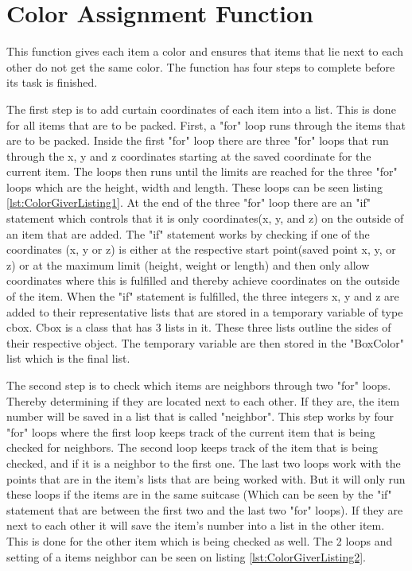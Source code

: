 \section{Color Assignment Function}
\label{sec:ColorGiver}
This function gives each item a color and ensures that items that lie next to each other do not get the same color. The function has four steps to complete before its task is finished.

The first step is to add curtain coordinates of each item into a list. This is done for all items that are to be packed. First, a "for" loop runs through the items that are to be packed. Inside the first "for" loop there are three "for" loops that run through the x, y and z coordinates starting at the saved coordinate for the current item. The loops then runs until the limits are reached for the three "for" loops which are the height, width and length. These loops can be seen listing \ref{lst:ColorGiverListing1}. At the end of the three "for" loop there are an "if" statement which controls that it is only coordinates(x, y, and z) on the outside of an item that are added. The "if" statement works by checking if one of the coordinates (x, y or z) is either at the respective start point(saved point x, y, or z) or at the maximum limit (height, weight or length) and then only allow coordinates where this is fulfilled and thereby achieve coordinates on the outside of the item.
When the "if" statement is fulfilled, the three integers x, y and z are added to their representative lists that are stored in a temporary variable of type cbox. Cbox is a class that has 3 lists in it. These three lists outline the sides of their respective object. The temporary variable are then stored in the "BoxColor" list which is the final list.

The second step is to check which items are neighbors through two "for" loops. Thereby determining if they are located next to each other. If they are, the item number will be saved in a list that is called "neighbor". This step works by four "for" loops where the first loop keeps track of the current item that is being checked for neighbors. The second loop keeps track of the item that is being checked, and if it is a neighbor to the first one. The last two loops work with the points that are in the item's lists that are being worked with. But it will only run these loops if the items are in the same suitcase (Which can be seen by the "if" statement that are between the first two and the last two "for" loops). If they are next to each other it will save the item's number into a list in the other item. This is done for the other item which is being checked as well. The 2 loops and setting of a items neighbor can be seen on listing \ref{lst:ColorGiverListing2}.

